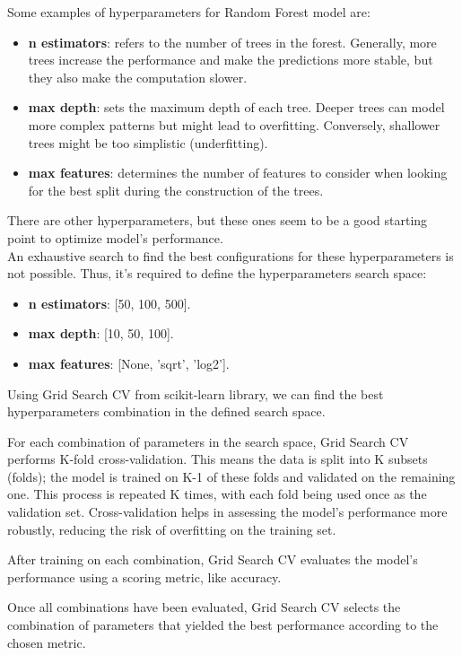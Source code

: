 \documentclass[a4paper,12pt]{article}
\begin{document}
Some examples of hyperparameters for Random Forest model are:
\begin{itemize}
    \item \textbf{n estimators}: refers to the number of trees in the forest. Generally, more trees increase the performance and make the predictions more stable, but they also make the computation slower.
    \item \textbf{max depth}: sets the maximum depth of each tree. Deeper trees can model more complex patterns but might lead to overfitting. Conversely, shallower trees might be too simplistic (underfitting).
    \item \textbf{max features}: determines the number of features to consider when looking for the best split during the construction of the trees.
\end{itemize}

There are other hyperparameters, but these ones seem to be a good starting point to optimize model's performance.\\

An exhaustive search to find the best configurations for these hyperparameters is not possible. Thus, it's required to define the hyperparameters search space:
\begin{itemize}
    \item \textbf{n estimators}: [50, 100, 500].
    \item \textbf{max depth}: [10, 50, 100].
    \item \textbf{max features}: [None, 'sqrt', 'log2'].
\end{itemize}

Using Grid Search CV from scikit-learn library, we can find the best hyperparameters combination in the defined search space.

For each combination of parameters in the search space, Grid Search CV performs K-fold cross-validation. This means the data is split into K subsets (folds); the model is trained on K-1 of these folds and validated on the remaining one. This process is repeated K times, with each fold being used once as the validation set. Cross-validation helps in assessing the model's performance more robustly, reducing the risk of overfitting on the training set.

After training on each combination, Grid Search CV evaluates the model's performance using a scoring metric, like accuracy.

Once all combinations have been evaluated, Grid Search CV selects the combination of parameters that yielded the best performance according to the chosen metric.
\end{document}
